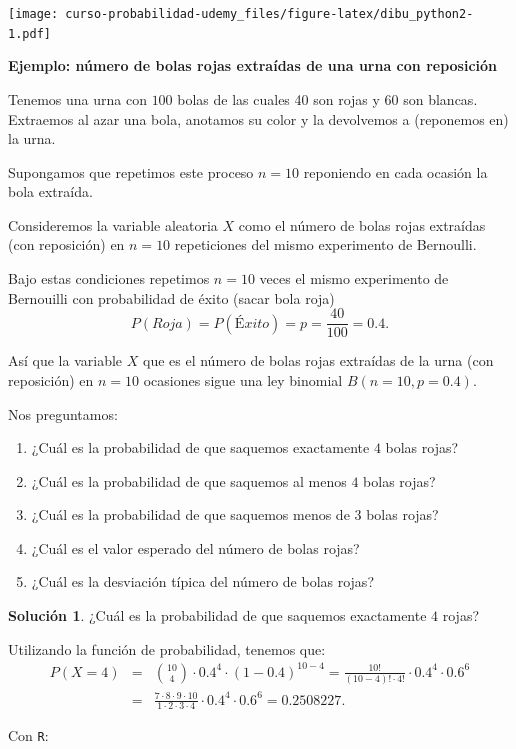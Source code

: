 \documentclass[]{book}
\providecommand{\tightlist}{%
  \setlength{\itemsep}{0pt}\setlength{\parskip}{0pt}}
\begin{document}
\texttt{[image: curso-probabilidad-udemy\_files/figure-latex/dibu\_python2-1.pdf]}

\textbf{Ejemplo: número de bolas rojas extraídas de una urna con reposición}

Tenemos una urna con \(100\) bolas de las cuales 40 son rojas y 60 son blancas. Extraemos al azar una bola, anotamos su color y la devolvemos a (reponemos en) la urna.

Supongamos que repetimos este proceso \(n=10\) reponiendo en cada ocasión la bola extraída.

Consideremos la variable aleatoria \(X\) como el número de bolas rojas extraídas (con reposición) en \(n=10\) repeticiones del mismo experimento de Bernoulli.

Bajo estas condiciones repetimos \(n=10\) veces el mismo experimento de Bernouilli con probabilidad de éxito (sacar bola roja)
\[P(Roja)=P(Éxito)=p=\frac{40}{100}=0.4.\]

Así que la variable \(X\) que es el número de bolas rojas extraídas de la urna (con reposición) en \(n=10\) ocasiones sigue una ley binomial \(B(n=10,p=0.4).\)

Nos preguntamos:

\begin{enumerate}
\def\labelenumi{\arabic{enumi}.}
\tightlist
\item
  ¿Cuál es la probabilidad de que saquemos exactamente \(4\) bolas rojas?
\item
  ¿Cuál es la probabilidad de que saquemos al menos \(4\) bolas rojas?
\item
  ¿Cuál es la probabilidad de que saquemos menos de \(3\) bolas rojas?
\item
  ¿Cuál es el valor esperado del número de bolas rojas?
\item
  ¿Cuál es la desviación típica del número de bolas rojas?
\end{enumerate}

\textbf{Solución 1}. ¿Cuál es la probabilidad de que saquemos exactamente \(4\) rojas?

Utilizando la función de probabilidad, tenemos que:
\begin{eqnarray*}
P(X=4)&=&{10\choose 4}\cdot 0.4^4\cdot (1-0.4)^{10-4}
= \frac{10!}{(10-4)!\cdot 4!}\cdot 0.4^4\cdot 0.6^6\\
&=& \frac{7\cdot 8\cdot 9\cdot 10}{1\cdot 2\cdot 3\cdot 4}\cdot 0.4^4\cdot 0.6^6=0.2508227.
\end{eqnarray*}

Con \texttt{R}:
\end{document}
